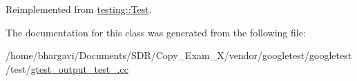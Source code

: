 Reimplemented from \hyperlink{classtesting_1_1_test_a5f0ab439802cbe0ef7552f1a9f791923}{testing\+::\+Test}.



The documentation for this class was generated from the following file\+:\begin{DoxyCompactItemize}
\item 
/home/bhargavi/\+Documents/\+S\+D\+R/\+Copy\+\_\+\+Exam\+\_\+X/vendor/googletest/googletest/test/\hyperlink{gtest__output__test___8cc}{gtest\+\_\+output\+\_\+test\+\_\+.\+cc}\end{DoxyCompactItemize}
